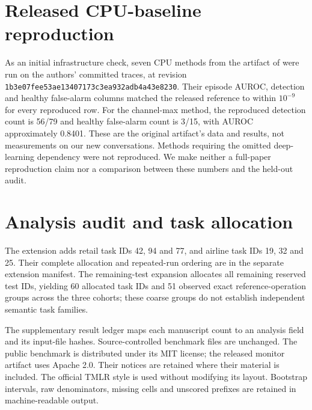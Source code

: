 \documentclass[10pt]{article}
\begin{document}
\section{Released CPU-baseline reproduction}
\label{app:reproduction}
As an initial infrastructure check, seven CPU methods from the artifact of \citet{dubey2026monitor} were run on the authors' committed traces, at revision \texttt{1b3e07fee53ae13407173c3ea932adb4a43e8230}. Their episode AUROC, detection and healthy false-alarm columns matched the released reference to within $10^{-9}$ for every reproduced row. For the channel-max method, the reproduced detection count is 56/79 and healthy false-alarm count is 3/15, with AUROC approximately 0.8401. These are the original artifact's data and results, not measurements on our new conversations. Methods requiring the omitted deep-learning dependency were not reproduced. We make neither a full-paper reproduction claim nor a comparison between these numbers and the held-out audit.

\section{Analysis audit and task allocation}
\begin{table}[htbp]\centering\caption{Task-level accounting for the original reserved-test cohort.}\label{tab:earlier-tasks}

\end{table}
The extension adds retail task IDs 42, 94 and 77, and airline task IDs 19, 32 and 25. Their complete allocation and repeated-run ordering are in the separate extension manifest. The remaining-test expansion allocates all remaining reserved test IDs, yielding 60 allocated task IDs and 51 observed exact reference-operation groups across the three cohorts; these coarse groups do not establish independent semantic task families.

The supplementary result ledger maps each manuscript count to an analysis field and its input-file hashes. Source-controlled benchmark files are unchanged. The public benchmark is distributed under its MIT license; the released monitor artifact uses Apache 2.0. Their notices are retained where their material is included. The official TMLR style is used without modifying its layout. Bootstrap intervals, raw denominators, missing cells and unscored prefixes are retained in machine-readable output.
\clearpage

\end{document}
